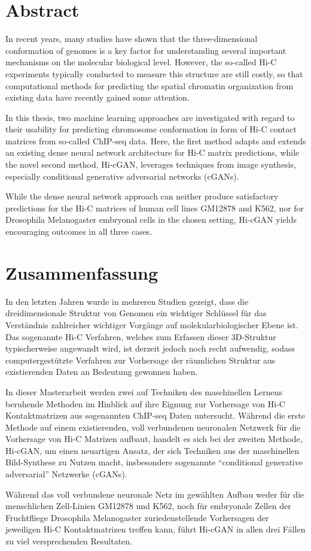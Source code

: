 \section*{Abstract}

In recent years, many studies have shown that the three-dimensional conformation of genomes is a key factor
for understanding several important mechanisms on the molecular biological level.
However, the so-called Hi-C experiments typically conducted to measure this structure are still costly,
so that computational methods for predicting the spatial chromatin organization from existing data have recently gained some attention. 

In this thesis, two machine learning approaches are investigated with 
regard to their usability for predicting chromosome conformation in form of Hi-C contact matrices from so-called ChIP-seq data.
Here, the first method adapts and extends an existing dense neural network architecture for Hi-C matrix predictions, 
while the novel second method, Hi-cGAN, leverages techniques from image synthesis, especially conditional generative adversarial networks (cGANs).

While the dense neural network approach can neither produce satisfactory predictions for the Hi\hbox{-}C matrices of human cell lines GM12878 and K562,
nor for Drosophila Melanogaster embryonal cells in the chosen setting, Hi-cGAN yields encouraging outcomes in all three cases.


\section*{Zusammenfassung}

In den letzten Jahren wurde in mehreren Studien gezeigt, dass die dreidimensionale Struktur von Genomen ein
wichtiger Schlüssel für das Verständnis zahlreicher wichtiger Vorgänge auf molekularbiologischer Ebene ist.
Das sogenannte Hi-C Verfahren, welches zum Erfassen dieser 3D-Struktur typischerweise angewandt wird,
ist derzeit jedoch noch recht aufwendig, sodass computergestützte Verfahren zur Vorhersage 
der räumlichen Struktur aus existierenden Daten an Bedeutung gewonnen haben.

In dieser Masterarbeit werden zwei auf Techniken des maschinellen Lernens beruhende Methoden im Hinblick auf ihre Eignung  
zur Vorhersage von Hi-C Kontaktmatrizen aus sogenannten ChIP-seq Daten untersucht.
Während die erste Methode auf einem existierenden, voll verbundenen neuronalen Netzwerk für die Vorhersage von Hi-C Matrizen aufbaut,
handelt es sich bei der zweiten Methode, Hi-cGAN, um einen neuartigen Ansatz, der sich Techniken aus der maschinellen Bild-Synthese zu Nutzen macht,
insbesondere sogenannte ``conditional generative adversarial'' Netzwerke (cGANs).

Während das voll verbundene neuronale Netz im gewählten Aufbau weder für die menschlichen Zell-Linien GM12878 und K562, 
noch für embryonale Zellen der Fruchtfliege Drosophila Melanogaster zuriedenstellende Vorhersagen der jeweiligen Hi-C Kontaktmatrizen treffen kann, 
führt Hi-cGAN in allen drei Fällen zu viel versprechenden Resultaten.
